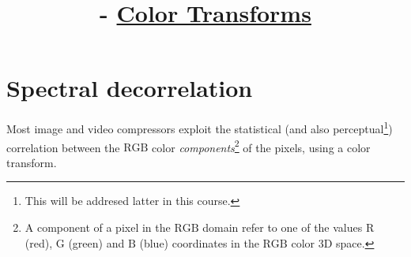 
%


\title{\SM{} - \href{https://github.com/Sistemas-Multimedia/Sistemas-Multimedia.github.io/tree/master/contents/color_transforms}{Color Transforms}}

\maketitle
\tableofcontents

\section{Spectral decorrelation}

Most image and video compressors exploit the statistical (and also
perceptual\footnote{This will be addresed latter in this course.})
correlation between the $\text{RGB}$ color
\emph{components}\footnote{A component of a pixel in the $\text{RGB}$
domain refer to one of the values $\text{R}$ (red), $\text{G}$ (green)
and $\text{B}$ (blue) coordinates in the $\text{RGB}$ color 3D space.}
of the pixels, using a color transform.

